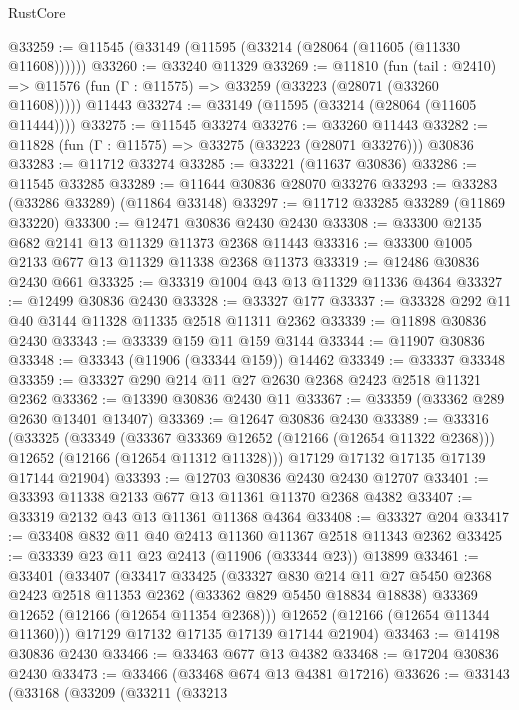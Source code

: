 \begin{lexlean}{RustCore}
\begin{coremodule}
@33259 := @11545 (@33149 (@11595 (@33214 (@28064 (@11605 (@11330 @11608))))))
@33260 := @33240 @11329
@33269 := @11810
    (fun (tail : @2410) => @11576 (fun (Γ : @11575) => @33259 (@33223 (@28071 (@33260 @11608)))))
    @11443
@33274 := @33149 (@11595 (@33214 (@28064 (@11605 @11444))))
@33275 := @11545 @33274
@33276 := @33260 @11443
@33282 := @11828 (fun (Γ : @11575) => @33275 (@33223 (@28071 @33276))) @30836
@33283 := @11712 @33274
@33285 := @33221 (@11637 @30836)
@33286 := @11545 @33285
@33289 := @11644 @30836 @28070 @33276
@33293 := @33283 (@33286 @33289) (@11864 @33148)
@33297 := @11712 @33285 @33289 (@11869 @33220)
@33300 := @12471 @30836 @2430 @2430
@33308 := @33300 @2135 @682 @2141 @13 @11329 @11373 @2368 @11443
@33316 := @33300 @1005 @2133 @677 @13 @11329 @11338 @2368 @11373
@33319 := @12486 @30836 @2430 @661
@33325 := @33319 @1004 @43 @13 @11329 @11336 @4364
@33327 := @12499 @30836 @2430
@33328 := @33327 @177
@33337 := @33328 @292 @11 @40 @3144 @11328 @11335 @2518 @11311 @2362
@33339 := @11898 @30836 @2430
@33343 := @33339 @159 @11 @159 @3144
@33344 := @11907 @30836
@33348 := @33343 (@11906 (@33344 @159)) @14462
@33349 := @33337 @33348
@33359 := @33327 @290 @214 @11 @27 @2630 @2368 @2423 @2518 @11321 @2362
@33362 := @13390 @30836 @2430 @11
@33367 := @33359 (@33362 @289 @2630 @13401 @13407)
@33369 := @12647 @30836 @2430
@33389 := @33316
    (@33325
      (@33349
        (@33367 @33369 @12652 (@12166 (@12654 @11322 @2368)))
        @12652
        (@12166 (@12654 @11312 @11328)))
      @17129
      @17132
      @17135
      @17139
      @17144
      @21904)
@33393 := @12703 @30836 @2430 @2430 @12707
@33401 := @33393 @11338 @2133 @677 @13 @11361 @11370 @2368 @4382
@33407 := @33319 @2132 @43 @13 @11361 @11368 @4364
@33408 := @33327 @204
@33417 := @33408 @832 @11 @40 @2413 @11360 @11367 @2518 @11343 @2362
@33425 := @33339 @23 @11 @23 @2413 (@11906 (@33344 @23)) @13899
@33461 := @33401
    (@33407
      (@33417
        @33425
        (@33327
          @830
          @214
          @11
          @27
          @5450
          @2368
          @2423
          @2518
          @11353
          @2362
          (@33362 @829 @5450 @18834 @18838)
          @33369
          @12652
          (@12166 (@12654 @11354 @2368)))
        @12652
        (@12166 (@12654 @11344 @11360)))
      @17129
      @17132
      @17135
      @17139
      @17144
      @21904)
@33463 := @14198 @30836 @2430
@33466 := @33463 @677 @13 @4382
@33468 := @17204 @30836 @2430
@33473 := @33466 (@33468 @674 @13 @4381 @17216)
@33626 := @33143
    (@33168
      (@33209
        (@33211
          (@33213

\end{coremodule}
\end{lexlean}
